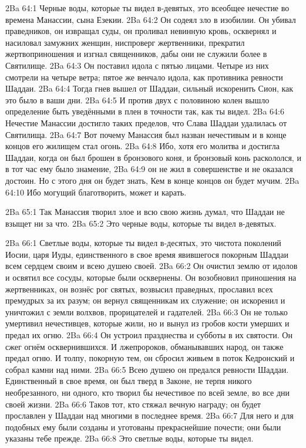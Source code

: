 \vs 2Ba 64:1
Черные воды, которые ты видел в-девятых, это всеобщее нечестие во времена Манассии, сына Езекии.
\vs 2Ba 64:2
Он содеял зло в изобилии. Он убивал праведников, он извращал суды, он проливал невинную кровь, осквернял и насиловал замужних женщин, ниспроверг жертвенники, прекратил жертвоприношения и изгнал священников, дабы они не служили более в Святилище.
\vs 2Ba 64:3
Он поставил идола с пятью лицами. Четыре из них смотрели на четыре ветра; пятое же венчало идола, как противника ревности Шаддаи.
\vs 2Ba 64:4
Тогда гнев вышел от Шаддаи, сильный искоренить Сион, как это было в ваши дни.
\vs 2Ba 64:5
И против двух с половиною колен вышло определение быть уведёнными в плен в точности так, как ты видел.
\vs 2Ba 64:6
Нечестие Манассии достигло таких пределов, что Слава Шаддаи удалилась от Святилища.
\vs 2Ba 64:7
Вот почему Манассия был назван нечестивым и в конце концов его жилищем стал огонь.
\vs 2Ba 64:8
Ибо, хотя его молитва и достигла Шаддаи, когда он был брошен в бронзового коня, и бронзовый конь раскололся, и в тот час ему было знамение,
\vs 2Ba 64:9
он не жил в совершенстве и не оказался достоин. Но с этого дня он будет знать, Кем в конце концов он будет мучим.
\vs 2Ba 64:10
Ибо могущий благотворить, может и карать.

\vs 2Ba 65:1
Так Манассия творил злое и всю свою жизнь думал, что Шаддаи не взыщет ни за что.
\vs 2Ba 65:2
Это черные воды, которые ты видел в-девятых.

\vs 2Ba 66:1
Светлые воды, которые ты видел в-десятых, это чистота поколений Иосии, царя Иуды, единственного в свое время явившегося покорным Шаддаи всем сердцем своим и всею душею своей.
\vs 2Ba 66:2
Он очистил землю от идолов и освятил все сосуды, которые были осквернены. Он возобновил приношения на жертвенниках, он вознёс рог святых, возвысил праведных, прославил всех премудрых за их разум; он вернул священникам их служение; он искоренил и уничтожил с земли волхвов, прорицателей и гадателей.
\vs 2Ba 66:3
Он не только умертивил нечестивцев, которые жили, но и вынул из гробов кости умерших и предал их огню.
\vs 2Ba 66:4
Он устроил празднества и субботы в их святости. Он сжег огнём осквернившихся. И лжепророков, обманывавших народ, он также предал огню. И толпу, покорную тем, он сбросил живьем в поток Кедронский и собрал камни над ними.
\vs 2Ba 66:5
Всею душею он предался ревности Шаддаи. Единственный в свое время, он был тверд в Законе, не терпя никого необрезанного, ни одного, кто творил бы нечестивое по всей земле, во все дни своей жизни.
\vs 2Ba 66:6
Таков тот, кто стяжал вечную награду; он будет прославлен у Шаддаи над многими в последнее время.
\vs 2Ba 66:7
Для него и для подобных ему были созданы и уготованы прекраснейшие почести; они были указаны тебе прежде.
\vs 2Ba 66:8
Это светлые воды, которые ты видел.

